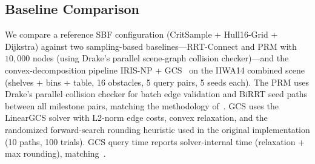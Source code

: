 \documentclass[journal]{IEEEtran}
\begin{document}
\subsection{Baseline Comparison}\label{sec:exp_baselines}

We compare a reference SBF configuration
(CritSample + Hull16-Grid + Dijkstra) against
two sampling-based baselines---RRT-Connect and PRM
with $10{,}000$ nodes (using Drake's parallel scene-graph collision
checker)---and the convex-decomposition pipeline
IRIS-NP + GCS~\cite{marcucci2024motion}
on the IIWA14 combined scene
(shelves + bins + table, 16 obstacles, 5 query pairs, 5 seeds each).
The PRM uses Drake's parallel collision checker for batch edge
validation and BiRRT seed paths between all milestone pairs,
matching the methodology of~\cite{marcucci2024motion}.
GCS uses the LinearGCS solver with L2-norm edge costs,
convex relaxation, and the randomized forward-search rounding heuristic
used in the original implementation (10 paths, 100 trials).
GCS query time reports solver-internal time
(relaxation + max rounding), matching~\cite{marcucci2024motion}.








\end{document}

